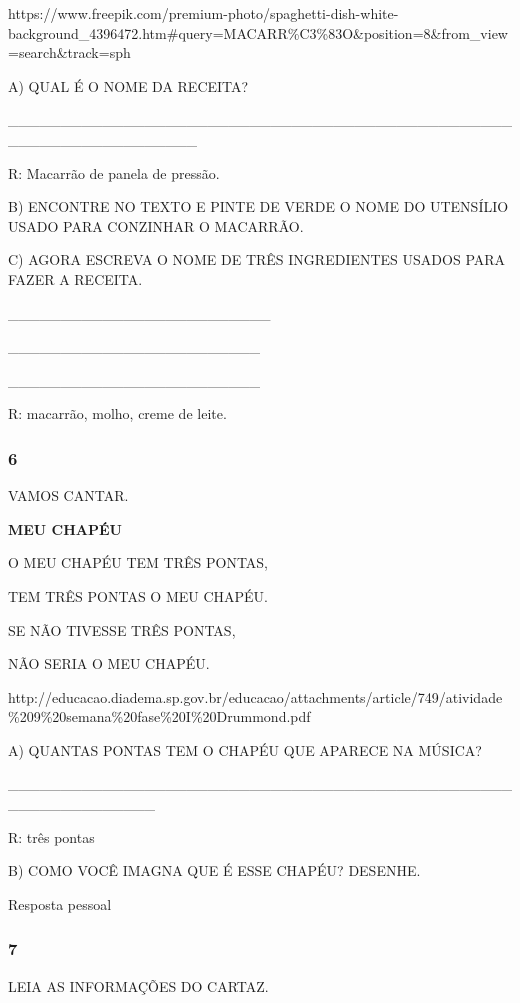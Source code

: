 https://www.freepik.com/premium-photo/spaghetti-dish-white-background\_4396472.htm\#query=MACARR\%C3\%83O\&position=8\&from\_view=search\&track=sph

A) QUAL É O NOME DA RECEITA?

\_\_\_\_\_\_\_\_\_\_\_\_\_\_\_\_\_\_\_\_\_\_\_\_\_\_\_\_\_\_\_\_\_\_\_\_\_\_\_\_\_\_\_\_\_\_\_\_\_\_\_\_\_\_\_\_\_\_\_\_\_\_\_\_\_\_

R: Macarrão de panela de pressão.

B) ENCONTRE NO TEXTO E PINTE DE VERDE O NOME DO UTENSÍLIO USADO PARA
CONZINHAR O MACARRÃO.

C) AGORA ESCREVA O NOME DE TRÊS INGREDIENTES USADOS PARA FAZER A
RECEITA.

\_\_\_\_\_\_\_\_\_\_\_\_\_\_\_\_\_\_\_\_\_\_\_\_\_

\_\_\_\_\_\_\_\_\_\_\_\_\_\_\_\_\_\_\_\_\_\_\_\_

\_\_\_\_\_\_\_\_\_\_\_\_\_\_\_\_\_\_\_\_\_\_\_\_

R: macarrão, molho, creme de leite.

\subsubsection{6}\label{section-34}

VAMOS CANTAR.

\textbf{MEU CHAPÉU}

O MEU CHAPÉU TEM TRÊS PONTAS,

TEM TRÊS PONTAS O MEU CHAPÉU.

SE NÃO TIVESSE TRÊS PONTAS,

NÃO SERIA O MEU CHAPÉU.

http://educacao.diadema.sp.gov.br/educacao/attachments/article/749/atividade\%209\%20semana\%20fase\%20I\%20Drummond.pdf

A) QUANTAS PONTAS TEM O CHAPÉU QUE APARECE NA MÚSICA?

\_\_\_\_\_\_\_\_\_\_\_\_\_\_\_\_\_\_\_\_\_\_\_\_\_\_\_\_\_\_\_\_\_\_\_\_\_\_\_\_\_\_\_\_\_\_\_\_\_\_\_\_\_\_\_\_\_\_\_\_\_\_

R: três pontas

B) COMO VOCÊ IMAGNA QUE É ESSE CHAPÉU? DESENHE.

Resposta pessoal

\subsubsection{7}\label{section-35}

LEIA AS INFORMAÇÕES DO CARTAZ.

